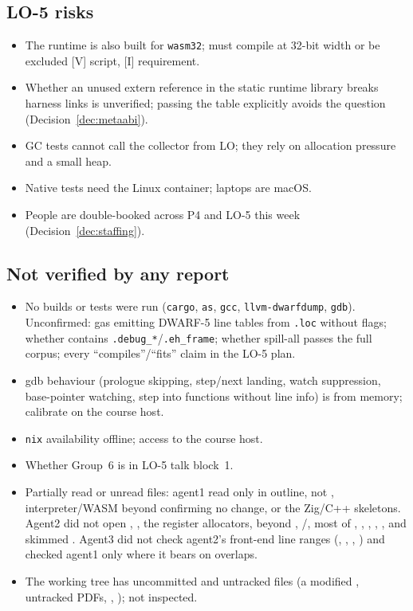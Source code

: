 \documentclass[10pt]{article}
\newcommand{\code}[1]{\texttt{\small #1}}
\newcommand{\mV}{\textsf{\scriptsize[V]}}
\newcommand{\mI}{\textsf{\scriptsize[I]}}
\begin{document}
\subsection{LO-5 risks}\label{sec:risk-lo5}
\begin{itemize}
\item The runtime is also built for \code{wasm32};  must compile at 32-bit width or be excluded \mV{} script, \mI{} requirement.
\item Whether an unused extern reference in the static runtime library breaks harness links is unverified; passing the table explicitly avoids the question (Decision~\ref{dec:metaabi}).
\item GC tests cannot call the collector from LO; they rely on allocation pressure and a small heap.
\item Native tests need the Linux container; laptops are macOS.
\item People are double-booked across P4 and LO-5 this week (Decision~\ref{dec:staffing}).
\end{itemize}

\subsection{Not verified by any report}\label{sec:risk-unverified}
\begin{itemize}
\item No builds or tests were run (\code{cargo}, \code{as}, \code{gcc}, \code{llvm-dwarfdump}, \code{gdb}). Unconfirmed: gas emitting DWARF-5 line tables from \code{.loc} without flags; whether  contains \code{.debug\_*}/\code{.eh\_frame}; whether spill-all passes the full corpus; every ``compiles''/``fits'' claim in the LO-5 plan.
\item gdb behaviour (prologue skipping, step/next landing, watch suppression, base-pointer watching, step into functions without line info) is from memory; calibrate on the course host.
\item \code{nix} availability offline; access to the course host.
\item Whether Group~6 is in LO-5 talk block~1.
\item Partially read or unread files: agent1 read  only in outline, not , interpreter/WASM beyond confirming no change, or the Zig/C++ skeletons. Agent2 did not open , , the register allocators,  beyond , /, most of , , , , , and skimmed . Agent3 did not check agent2's front-end line ranges (, , , ) and checked agent1 only where it bears on overlaps.
\item The working tree has uncommitted and untracked files (a modified , untracked PDFs, , ); not inspected.
\end{itemize}
\end{document}
